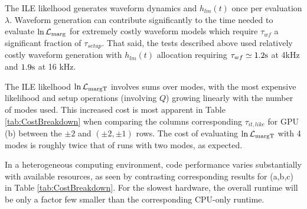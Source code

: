 \documentclass[twocolumn,prd,nofootinbib]{revtex4}
\newcommand\unit[1]{{\rm #1}}
\newcommand\ILE{ILE}
\begin{document}
The \ILE{} likelhood  generates waveform dynamics and $h_{lm}(t)$ once per evaluation $\lambda$.   Waveform generation can contribute significantly to the
time needed to evaluate  $\ln {\cal L}_{\rm marg}$ for extremely costly
waveform models which require $\tau_{wf} $ a significant fraction of $  \tau_{setup}$.   That said, the tests described
above used relatively costly waveform generation with $h_{lm}(t)$ allocation requiring $\tau_{wf} \simeq 1.2 \unit{s}$
at 4kHz and $1.9\unit{s}$ at 16 kHz.

The \ILE{} likelhood $\ln {\cal L}_{\rm margT}$ involves sums over modes, with the most expensive likelihood and setup operations (involving $Q$) growing linearly with
the number of modes used.  This increased cost is most apparent in Table \ref{tab:CostBreakdown} when comparing the
columns corresponding  $\tau_{it,like}$ for GPU (b) between the $\pm 2$ and $(\pm 2,\pm 1)$ rows.  The cost of
evaluating $\ln {\cal L}_{\rm margT}$   with 4 modes is roughly twice that of runs with two modes, as expected. 

In a heterogeneous computing environment, code performance varies substantially with available resources, as seen by
contrasting corresponding results for (a,b,c) in Table \ref{tab:CostBreakdown}.      For
the slowest hardware,  the overall runtime will be only a factor few smaller than the corresponding CPU-only runtime.
\end{document}
